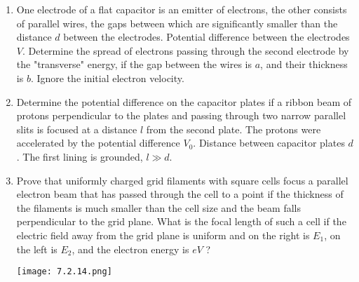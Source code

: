 \documentclass{article}
\begin{document}
\begin{enumerate}[label=7.2.\arabic*]
\item One electrode of a flat capacitor is an emitter of electrons, the other consists of parallel wires, the gaps between which are significantly smaller than the distance $d$ between the electrodes. Potential difference between the electrodes $V$. Determine the spread of electrons passing through the second electrode by the "transverse" energy, if the gap between the wires is $a$, and their thickness is $b$. Ignore the initial electron velocity.

\item Determine the potential difference on the capacitor plates if a ribbon beam of protons perpendicular to the plates and passing through two narrow parallel slits is focused at a distance $l$ from the second plate. The protons were accelerated by the potential difference $V_0$. Distance between capacitor plates $d$. The first lining is grounded, $l \gg d$.

\item Prove that uniformly charged grid filaments with square cells focus a parallel electron beam that has passed through the cell to a point if the thickness of the filaments is much smaller than the cell size and the beam falls perpendicular to the grid plane. What is the focal length of such a cell if the electric field away from the grid plane is uniform and on the right is $E_1$, on the left is $E_2$, and the electron energy is $eV$ ?

\begin{center}
    \texttt{[image: 7.2.14.png]}
\end{center}


\end{enumerate}
\end{document}
